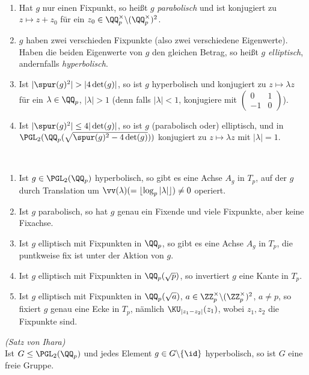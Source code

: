 \DB\ \begin{enumerate}
\item Hat $g$ nur einen Fixpunkt, so heißt $g$
\emph{parabolisch} und ist konjugiert zu
$z\mapsto z+z_0$ für ein
$z_0\in\QQ_p^\times\backslash(\QQ_p^\times)^2$.
\item $g$ haben zwei verschieden Fixpunkte (also zwei
verschiedene Eigenwerte).
Haben die beiden Eigenwerte von $g$ den gleichen Betrag, so
heißt $g$ \emph{elliptisch}, andernfalls
\emph{hyperbolisch}.
\item Ist $|\spur(g)^2|>|4\det(g)|$, so ist $g$
hyperbolisch und konjugiert zu $z\mapsto\lambda z$ für ein
$\lambda\in\QQ_p$, $|\lambda|>1$ (denn falls $|\lambda|<1$,
konjugiere mit $\begin{pmatrix}0&1\\ -1&0\end{pmatrix}$).
\item Ist $|\spur(g)^2|\leq 4|\det(g)|$, so ist $g$
(parabolisch oder) elliptisch, und in\\
$\PGL_2(\QQ_p(\sqrt{\spur(g)^2-4\det(g)}))$ konjugiert
zu $z\mapsto \lambda z$ mit $|\lambda|=1$.
\end{enumerate}

\BEM\ \label{bem_hep}
\begin{enumerate}
\item Ist $g\in\PGL_2(\QQ_p)$ hyperbolisch, so gibt es eine
Achse $A_g$ in $T_p$, auf der $g$ durch Translation um
$\vv(\lambda)(=\lfloor\log_p|\lambda|\rfloor)\neq 0$ operiert.
\item Ist $g$ parabolisch, so hat $g$ genau ein Fixende
und viele Fixpunkte, aber keine Fixachse.
\item Ist $g$ elliptisch mit Fixpunkten in $\QQ_p$, so gibt es
eine Achse $A_g$ in $T_p$, die puntkweise fix ist unter
der Aktion von $g$.
\item Ist $g$ elliptisch mit Fixpunkten in $\QQ_p(\sqrt{p})$,
so invertiert $g$ eine Kante in $T_p$.
\item Ist $g$ elliptisch mit Fixpunkten in $\QQ_p(\sqrt{a})$,
$a\in\ZZ_p^\times\backslash(\ZZ_p^\times)^2$, $a\neq p$,
so fixiert $g$
genau eine Ecke in $T_p$, nämlich $\KU_{|z_1-z_2|}(z_1)$, wobei
$z_1, z_2$ die Fixpunkte sind.
\end{enumerate}

\SATZ\label{satz_ihara} \emph{(Satz von Ihara)}\\
Ist $G\leq\PGL_2(\QQ_p)$ und jedes Element
$g\in G\backslash\{\id\}$ hyperbolisch,
so ist $G$ eine freie Gruppe.


